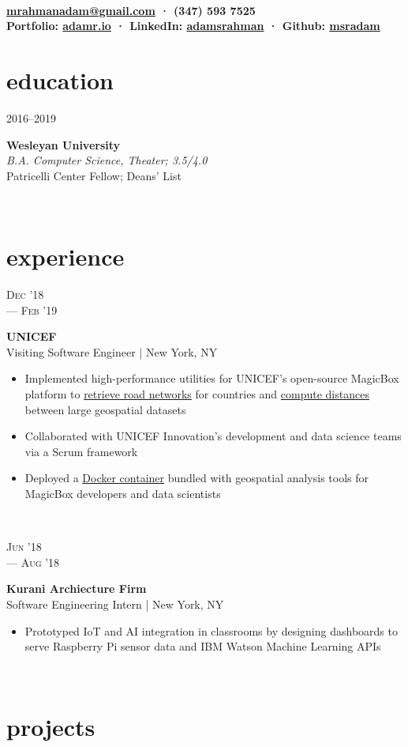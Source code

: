 \documentclass[letterpaper, 11pt]{article}
\author{Adam Rahman}
\makeatletter
\renewcommand{\maketitle}{
	\hspace{.125\textwidth}
	\begin{minipage}[t]{.75\textwidth}
    \begin{center}
        \fontsize{18pt}{15pt}\selectfont\bfseries \theauthor \\
        \fontsize{10pt}{15pt}\selectfont\sf
        \href{mailto:mrahmanadam@gmail.com}{mrahmanadam@gmail.com} · (347) 593 7525 \\
        Portfolio: \href{http://adamr.io}{adamr.io} · 
        LinkedIn: \href{https://www.linkedin.com/in/adamsrahman/}{adamsrahman} · 
        Github: \href{https://github.com/msradam}{msradam}  \\ 
        \end{center}
    \end{minipage}}
\newcommand{\eduentry}[4]{
    \begin{minipage}[t]{.15\linewidth}
    \hfill \textsc{#1}
    \end{minipage}
    \hfill\vline\hfill
    \begin{minipage}[t]{.80\linewidth}
    {\bf\large#2}
    \vspace{1pt}
    \\\textit{#3} \small{#4}
    \end{minipage}\\
    \vspace{.2cm}
    }
\newcommand{\expentry}[5]{
    \begin{minipage}[t]{.15\linewidth}
    \hfill \textsc{#1} \\
    \hfill \hspace*{5pt}\hfill --- \textsc{#2}
    \end{minipage}
    \hfill\vline\hfill
    \begin{minipage}[t]{.80\linewidth}
    {\bf\large#3}
    \\ #4 
    \vspace{-1.5mm}
    \small{#5}
    \end{minipage}\\
    \vspace{.2cm}
    }
\makeatother
\begin{document}
    \maketitle
    \vspace{.5cm}


    \section{education}
    \eduentry{2016--2019}
    {Wesleyan University}
    {B.A. Computer Science, Theater; 3.5/4.0}
    {\\ Patricelli Center Fellow; Deans' List}


    \section{experience}
    \expentry{Dec '18}
    {Feb '19}
    {UNICEF}
    {Visiting Software Engineer | New York, NY}
    {

        \begin{itemize}{\leftmargin=0.5em \itemindent=0em}
          \setlength\itemsep{0.1mm}
          \item Implemented high-performance utilities for UNICEF's open-source MagicBox platform to \href{https://github.com/unicef/magicbox-download-roads}{retrieve road networks} for countries and \href{https://github.com/msradam/magicbox-site-routing}{compute distances} between large geospatial datasets 
          \item Collaborated with UNICEF Innovation's development and data science teams via a Scrum framework
          \item Deployed a \href{https://hub.docker.com/r/msradam/magicbox-tools}{Docker container} bundled with geospatial analysis tools for MagicBox developers and data scientists
        \end{itemize}
        
    }

    \expentry{Jun '18}
    {Aug '18}
    {Kurani Archiecture Firm}
    {Software Engineering Intern | New York, NY}
    {\begin{itemize}
          \setlength\itemsep{0.1mm}
          \item Prototyped IoT and AI integration in classrooms by designing dashboards to serve Raspberry Pi sensor data and IBM Watson Machine Learning APIs
        \end{itemize}
    }

    \section{projects}
\end{document}
